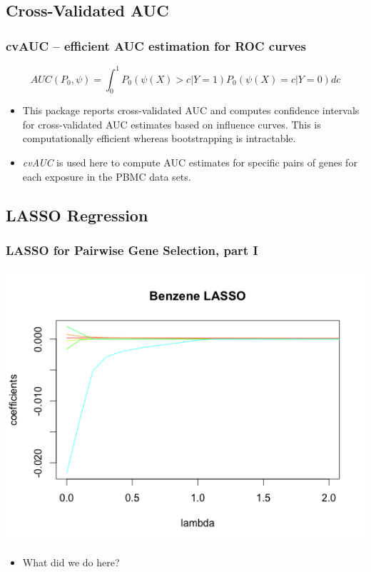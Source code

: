 \documentclass{beamer}
\begin{document}
\subsection{Cross-Validated AUC}

\begin{frame}[fragile]
  	\frametitle{cvAUC -- efficient AUC estimation for ROC curves}
 		$$AUC(P_{0},\psi) = \int_{0}^{1} P_{0}(\psi(X) > c | Y=1) P_{0}(\psi(X) = c | Y=0) dc$$
		\begin{itemize}
			\item This package reports cross-validated AUC and computes confidence intervals for cross-validated AUC estimates based on influence curves. This is computationally efficient whereas bootstrapping is intractable.
			\item \textit{cvAUC} is used here to compute AUC estimates for specific pairs of genes for each exposure in the PBMC data sets.
		\end{itemize}
\end{frame}

\subsection{LASSO Regression}

\begin{frame}[fragile]
  	\frametitle{LASSO for Pairwise Gene Selection, part I}
		\centering
 		\includegraphics[scale=0.5]{../paper/figs/lasso_coef.png}
		\begin{itemize}
			\item What did we do here?
		\end{itemize}
\end{frame}
\end{document}
